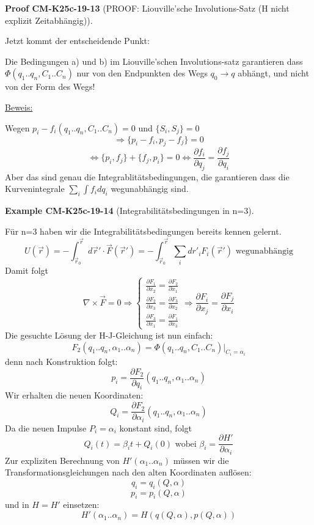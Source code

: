 \documentclass[10pt, letterpaper]{article}
\newcommand{\CustomHeading}[3]{%
  \par\medskip\noindent%
  \textbf{#1 #2} \textnormal{(#3)}.\enskip%
}
\newenvironment{EXA}[2]{\CustomHeading{Example}{#1}{#2}}{}
\newenvironment{PROOF}[2]{\CustomHeading{Proof}{#1}{#2}}{}
\begin{document}
\begin{PROOF}{CM-K25c-19-13}{PROOF: Liouville'sche Involutions-Satz (H nicht explizit Zeitabhängig)}
Jetzt kommt der entscheidende Punkt:

Die Bedingungen a) und b) im Liouville'schen Involutions-satz garantieren dass $\Phi(q_1..q_n,C_1..C_n)$ nur von den Endpunkten des Wegs $q_0 \rightarrow q$ abhängt, und nicht von der Form des Wegs!

\underline{Beweis:}

Wegen $p_i - f_i(q_1..q_n,C_1..C_n)=0$ und $\{S_i,S_j\}=0$
\[
\Rightarrow \{p_i-f_i, p_j-f_j\}=0
\]
\[
\Leftrightarrow \{p_i,f_j\} + \{f_j,p_i\}=0 \Leftrightarrow \frac{\partial f_i}{\partial q_j} = \frac{\partial f_j}{\partial q_i}
\]
Aber das sind genau die Integrablitätsbedingungen, die garantieren dass die Kurvenintegrale $\sum_i \int f_i dq_i$ wegunabhängig sind.
\end{PROOF}

\begin{EXA}{CM-K25c-19-14}{Integrabilitätsbedingungen in n=3}
Für n=3 haben wir die Integrabilitätsbedingungen bereits kennen gelernt.
\[
U(\vec{r}) = -\int_{\vec{r}_0}^{\vec{r}} d\vec{r}' \cdot \vec{F}(\vec{r}') = -\int_{\vec{r}_0}^{\vec{r}} \sum_i dr'_i F_i(\vec{r}') \text{ wegunabhängig}
\]
Damit folgt
\[
\nabla \times \vec{F} = 0 \Rightarrow 
\begin{cases}
\frac{\partial F_1}{\partial x_2} = \frac{\partial F_2}{\partial x_1} \\[1em]
\frac{\partial F_2}{\partial x_3} = \frac{\partial F_3}{\partial x_2} \\[1em]
\frac{\partial F_3}{\partial x_1} = \frac{\partial F_1}{\partial x_3}
\end{cases}
\Rightarrow \frac{\partial F_i}{\partial x_j} = \frac{\partial F_j}{\partial x_i}
\]
Die gesuchte Lösung der H-J-Gleichung ist nun einfach:
\[
F_2(q_1..q_n,\alpha_1..\alpha_n) = \Phi(q_1..q_n,C_1..C_n)\big|_{C_i=\alpha_i}
\]
denn nach Konstruktion folgt:
\[
p_i = \frac{\partial F_2}{\partial q_i}(q_1..q_n,\alpha_1..\alpha_n)
\]
Wir erhalten die neuen Koordinaten:
\[
Q_i = \frac{\partial F_2}{\partial \alpha_i}(q_1..q_n,\alpha_1..\alpha_n)
\]
Da die neuen Impulse $P_i = \alpha_i$ konstant sind, folgt
\[
Q_i(t) = \beta_i t + Q_i(0) \text{ wobei } \beta_i = \frac{\partial H'}{\partial \alpha_i}
\]
Zur expliziten Berechnung von $H'(\alpha_1..\alpha_n)$ müssen wir die Transformationsgleichungen nach den alten Koordinaten auflösen:
\[
q_i = q_i(Q,\alpha)
\]
\[
p_i = p_i(Q,\alpha)
\]
und in $H = H'$ einsetzen: 
$$H'(\alpha_1..\alpha_n) = H(q(Q,\alpha), p(Q,\alpha))$$
\end{EXA}
\end{document}
